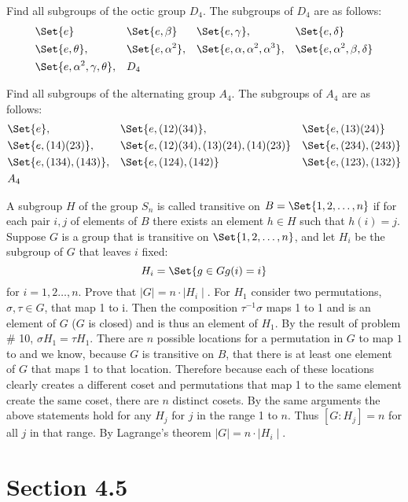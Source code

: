 \documentclass[paper=a4, fontsize=11pt]{jhwhw} %
\providecommand\given{} %
\begin{document}
Find all subgroups of the octic group $D_4$.
\solution
The subgroups of $D_4$ are as follows:
\begin{align*}
    &\Set{e} && \Set{e, \beta} && \Set{e, \gamma}, &&\Set{e, \delta}\\
    &\Set{e, \theta}, &&\Set{e, \alpha^2}, &&\Set{e, \alpha, \alpha^2, \alpha^3}, &&\Set{e,\alpha^2, \beta, \delta}\\
    &\Set{e, \alpha^2, \gamma, \theta}, &&D_4
\end{align*}


Find all subgroups of the alternating group $A_4$.
\solution
The subgroups of $A_4$ are as follows:
\begin{align*}
    &\Set{e}, && \Set{e, (1 2)(3 4)}, && \Set{e, (1 3)(2 4)}\\
    &\Set{e, (1 4)(2 3)}, &&\Set{e, (1 2)(3 4), (1 3)(2 4), (1 4)(2 3)} &&\Set{e, (2 3 4), (2 4 3)}\\
    &\Set{e, (1 3 4), (1 4 3)}, &&\Set{e, (1 2 4), (1 4 2)} && \Set{e, (1 2 3), (1 3 2)}\\
    &A_4
\end{align*}

A subgroup $H$ of the group $S_n$ is called transitive on $B = \Set{1, 2,\ldots, n}$ if for each pair $i, j$ of elements of $B$ there exists an element $h\in H$ such that $h(i) = j$. Suppose $G$ is a group that is transitive on $\Set{1, 2,\ldots, n}$, and let $H_i$ be the subgroup of $G$ that leaves $i$ fixed:
$$H_i = \Set{g\in G\given g(i) = i}$$
for $i=1, 2\ldots, n$. Prove that $\mid G\mid = n \cdot \mid H_i\mid$.
\solution
For $H_1$ consider two permutations, $\sigma, \tau \in G$, that map 1 to i. Then the composition $\tau^{-1}\sigma$ maps 1 to 1 and is an element of $G$ ($G$ is closed) and is thus an element of $H_1$. By the result of problem \# 10, $\sigma H_1 = \tau H_1$. There are $n$ possible locations for a permutation in $G$ to map $1$ to and we know, because $G$ is transitive on $B$, that there is at least one element of $G$ that maps 1 to that location. Therefore because each of these locations clearly creates a different coset and permutations that map 1 to the same element create the same coset, there are $n$ distinct cosets. By the same arguments the above statements hold for any $H_j$ for $j$ in the range 1 to $n$. Thus $[G:H_j] = n$ for all $j$ in that range. By Lagrange's theorem $\mid G\mid = n \cdot \mid H_i \mid$.

\newpage
\section*{Section 4.5}
\end{document}
